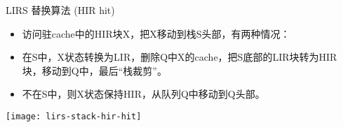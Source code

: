 \begin{frame}[plain]
	\frametitle{ }
	\begin{columns}
		\begin{column}{.1\textwidth}
			\centering

			
		\end{column}
		
		\begin{column}{.9\textwidth}
			LIRS 替换算法 (HIR hit)
			
			\begin{itemize}
				
			\item 访问驻cache中的HIR块X，把X移动到栈S头部，有两种情况：
				\item 在S中，X状态转换为LIR，删除Q中X的cache，把S底部的LIR块转为HIR块，移动到Q中，最后“栈裁剪”。
				\item 不在S中，则X状态保持HIR，从队列Q中移动到Q头部。
				
				
			\end{itemize}
			\centering
			 \texttt{[image: lirs-stack-hir-hit]}
			
		\end{column}
		
		
	\end{columns}
\end{frame}





